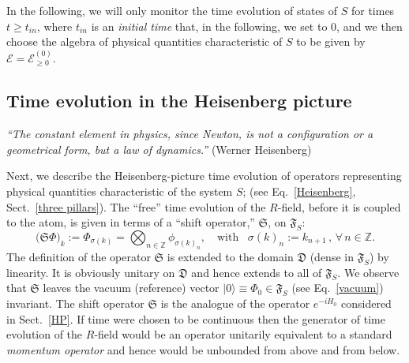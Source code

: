 \documentclass[12pt]{article}
\begin{document}
In the following, we will only monitor the time evolution of states of $S$ for times  $t\geq t_{in}$, where $t_{in}$ 
is an \textit{initial time} that, in the following, we set to 0, and we then choose the algebra of physical quantities 
characteristic of $S$ to be given by $\mathcal{E}= \mathcal{E}_{\geq 0}^{(0)}$. 

\subsection{Time evolution in the Heisenberg picture}

\hspace{0.5cm} \textit{``The constant element in physics, since Newton, is not a configuration or a geometrical form, but a law of dynamics.''} (Werner Heisenberg)

Next, we describe the Heisenberg-picture time evolution of operators representing physical quantities characteristic 
of the system $S$; (see Eq.~\eqref{Heisenberg}, Sect.~\ref{three pillars}). The ``free'' time evolution of the $R$-field, before it is coupled to the atom, is given in terms of
a ``shift operator,'' $\mathfrak{S}$, on $\mathfrak{F}_S$:
\begin{equation}\label{shift map}
\big(\mathfrak{S}\Phi\big)_{{k}}:= \Phi_{\sigma({k})} = \bigotimes_{n\in \mathbb{Z}} \phi_{\sigma({k})_{n}}, \quad \text{with  }\,\,\, \sigma({k})_n := k_{n+1}\,, \,\forall\, n\in \mathbb{Z}.
\end{equation}
The definition of the operator $\mathfrak{S}$ is extended to the domain $\mathfrak{D}$ (dense in $\mathfrak{F}_S$) by 
linearity. It is obviously unitary on $\mathfrak{D}$ and hence extends to all of $\mathfrak{F}_S$. We observe that 
$\mathfrak{S}$ leaves the vacuum (reference) vector $\vert 0 \rangle \equiv \Phi_{{0}} \in \mathfrak{F}_S$ 
(see Eq.~\eqref{vacuum}) invariant. The shift operator $\mathfrak{S}$ is the analogue of the operator $e^{-iH_0}$ 
considered in Sect.~\ref{HP}. If time were chosen to be continuous then the generator of time evolution of the $R$-field 
would be an operator unitarily equivalent to a standard \textit{momentum operator} and hence would be unbounded 
from above and from below.
\end{document}
